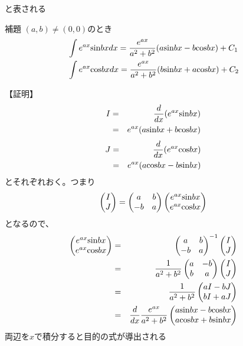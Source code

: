 \documentclass[pdflatex,ja=standard,fleqn]{bxjsarticle}
\begin{document}
と表される
\begin{itembox}[l]{補題}
    $(a,b)\ne(0,0)$のとき
    \begin{align*}
        &\int e^{ax}{\rm sin}bxdx=\frac{e^{ax}}{a^2+b^2}(a{\rm sin}bx-b{\rm cos}bx)+C_{1}\\
        &\int e^{ax}{\rm cos}bxdx=\frac{e^{ax}}{a^2+b^2}(b{\rm sin}bx+a{\rm cos}bx)+C_{2}
    \end{align*}
\end{itembox}
【証明】
\begin{eqnarray*}
    I&=&\frac{d}{dx}(e^{ax}{\rm sin}bx)\\
    &=&e^{ax}(a{\rm sin}bx+b{\rm cos}bx)
\end{eqnarray*}
\begin{eqnarray*}
    J&=&\frac{d}{dx}(e^{ax}{\rm cos}bx)\\
    &=&e^{ax}(a{\rm cos}bx-b{\rm sin}bx) 
\end{eqnarray*}
とそれぞれおく。つまり
\begin{eqnarray*}
    \begin{pmatrix}I\\J\end{pmatrix}=\begin{pmatrix}a&b\\-b&a\end{pmatrix}\begin{pmatrix}e^{ax}{\rm sin}bx\\e^{ax}{\rm cos}bx\end{pmatrix}
\end{eqnarray*}
となるので、
\begin{eqnarray*}
    \begin{pmatrix}e^{ax}{\rm sin}bx\\e^{ax}{\rm cos}bx\end{pmatrix}
    &=&\begin{pmatrix}a&b\\-b&a\end{pmatrix}^{-1}\begin{pmatrix}I\\J\end{pmatrix}\\
    &=&\frac{1}{a^2+b^2}\begin{pmatrix}a&-b\\b&a\end{pmatrix}\begin{pmatrix}I\\J\end{pmatrix}\\
    &=&\frac{1}{a^2+b^2}\begin{pmatrix}aI-bJ\\bI+aJ\end{pmatrix}\\
    &=&\frac{d}{dx}\frac{e^{ax}}{a^2+b^2}\begin{pmatrix}a{\rm sin}bx-b{\rm cos}bx\\a{\rm cos}bx+b{\rm sin}bx\end{pmatrix}
\end{eqnarray*}
両辺を$x$で積分すると目的の式が導出される
\end{document}
